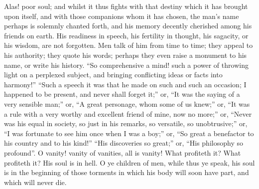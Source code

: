 Alas! poor soul; and whilst it thus fights with that destiny which
it has brought upon itself, and with those companions whom it has
chosen, the man's name perhaps is solemnly chanted forth, and his
memory decently cherished among his friends on earth. His readiness in
speech, his fertility in thought, his sagacity, or his wisdom, are not
forgotten. Men talk of him from time to time; they appeal to his
authority; they quote his words; perhaps they even raise a monument to
his name, or write his history. ``So comprehensive a mind! such a
power of throwing light on a perplexed subject, and bringing
conflicting ideas or facts into harmony!'' ``Such a speech it
was that he made on such and such an occasion; I happened to be
present, and never shall forget it;'' or, ``It was the saying
of a very sensible man;'' or, ``A great personage, whom some
of us knew;'' or, ``It was a rule with a very worthy and
excellent friend of mine, now no more;'' or, ``Never was his
equal in society, so just in his remarks, so versatile, so
unobtrusive;'' or, ``I was fortunate to see him once when I
was a boy;'' or, ``So great a benefactor to his country and to
his kind!'' ``His discoveries so great;'' or, ``His
philosophy so profound''. O vanity! vanity of vanities, all is
vanity! What profiteth it? What profiteth it? His soul is in hell. O
ye children of men, while thus ye speak, his soul is in the beginning
of those torments in which his body will soon have part, and which
will never die.

